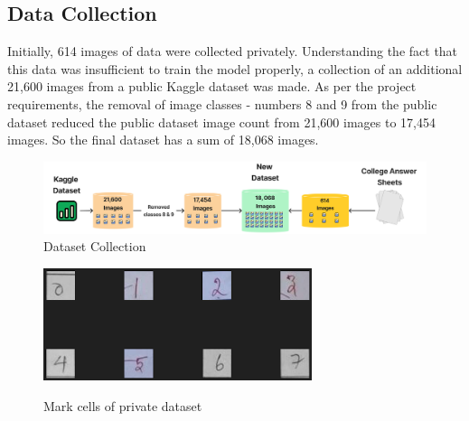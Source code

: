 \clearpage

\subsection{Data Collection}

\noindent Initially, 614 images of data were collected privately. Understanding the fact that this data was insufficient to train the model properly, a collection of an additional 21,600 images from a public Kaggle dataset was made. As per the project requirements, the removal of image classes - numbers 8 and 9 from the public dataset reduced the public dataset image count from 21,600 images to 17,454 images. So the final dataset has a sum of 18,068 images.




\begin{figure}[h!]
    \centering
    \includegraphics[width=\textwidth]
    {Images/Block_Diag/Dataset_Counts.png}
    \caption{Dataset Collection}
\end{figure}

\begin{figure}[h!]
    \centering
{\includegraphics[width=0.7\textwidth]{Images/Block_Diag/Clg_ans_sheet.png}}
  \vspace{-15pt}
  \caption{Mark cells of private dataset}
\end{figure} 

